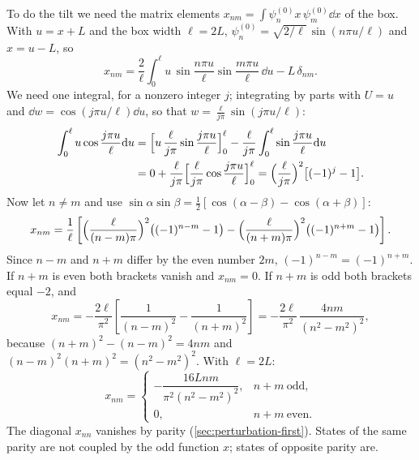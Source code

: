To do the tilt we need the matrix elements $x_{nm}=\int\psi_n^{(0)}x\,\psi_m^{(0)}\dd x$ of the box. With $u=x+L$ and the box width $\ell=2L$, $\psi_n^{(0)}=\sqrt{2/\ell}\,\sin(n\pi u/\ell)$ and $x=u-L$, so
\[
x_{nm}=\frac2\ell\int_0^\ell u\,\sin\frac{n\pi u}{\ell}\sin\frac{m\pi u}{\ell}\,\dd u-L\,\delta_{nm}.
\]
We need one integral, for a nonzero integer $j$; integrating by parts with $U=u$ and $\dd w=\cos(j\pi u/\ell)\dd u$, so that $w=\frac{\ell}{j\pi}\sin(j\pi u/\ell)$:
\begin{align}
\int_0^\ell u\cos\frac{j\pi u}{\ell}\mathrm{d} u
&=\Bigl[u\,\frac{\ell}{j\pi}\sin\frac{j\pi u}{\ell}\Bigr]_0^\ell-\frac{\ell}{j\pi}\int_0^\ell\sin\frac{j\pi u}{\ell}\mathrm{d} u \notag\\
&=0+\frac{\ell}{j\pi}\Bigl[\frac{\ell}{j\pi}\cos\frac{j\pi u}{\ell}\Bigr]_0^\ell
=\Bigl(\frac{\ell}{j\pi}\Bigr)^2\bigl[(-1)^j-1\bigr].
\label{eq:perturbation-ucos}
\end{align}
Now let $n\ne m$ and use $\sin\alpha\sin\beta=\tfrac12[\cos(\alpha-\beta)-\cos(\alpha+\beta)]$:
\[
x_{nm}=\frac1\ell\left[\Bigl(\frac{\ell}{(n-m)\pi}\Bigr)^2\bigl((-1)^{n-m}-1\bigr)-\Bigl(\frac{\ell}{(n+m)\pi}\Bigr)^2\bigl((-1)^{n+m}-1\bigr)\right].
\]
Since $n-m$ and $n+m$ differ by the even number $2m$, $(-1)^{n-m}=(-1)^{n+m}$. If $n+m$ is even both brackets vanish and $x_{nm}=0$. If $n+m$ is odd both brackets equal $-2$, and
\[
x_{nm}=-\frac{2\ell}{\pi^2}\left[\frac{1}{(n-m)^2}-\frac{1}{(n+m)^2}\right]=-\frac{2\ell}{\pi^2}\,\frac{4nm}{(n^2-m^2)^2},
\]
because $(n+m)^2-(n-m)^2=4nm$ and $(n-m)^2(n+m)^2=(n^2-m^2)^2$. With $\ell=2L$:
\begin{equation}
x_{nm}=\begin{cases}-\dfrac{16Lnm}{\pi^2(n^2-m^2)^2}, & n+m\ \text{odd},\\[8pt] 0, & n+m\ \text{even}.\end{cases}
\label{eq:perturbation-xnm}
\end{equation}
The diagonal $x_{nn}$ vanishes by parity (\cref{sec:perturbation-first}). States of the same parity are not coupled by the odd function $x$; states of opposite parity are.


